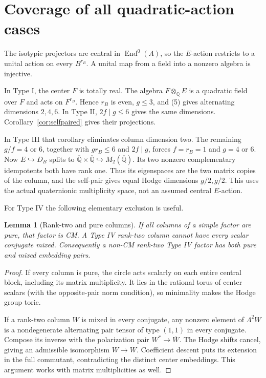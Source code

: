 \documentclass[11pt]{article}
\newcommand{\Q}{\mathbb Q}
\newcommand{\kk}{{\overline{\mathbb Q}}}
\DeclareMathOperator{\End}{End}
\newtheorem{lemma}[theorem]{Lemma}
\theoremstyle{remark}
\begin{document}
\section{Coverage of all quadratic-action cases}

The isotypic projectors are central in $\End^0(A)$, so the $E$-action
restricts to a unital action on every $B^{r_B}$. A unital map from
a field into a nonzero algebra is injective.

In Type I, the center $F$ is totally real. The algebra $F\otimes_\Q E$
is a quadratic field over $F$ and acts on $F^{r_B}$. Hence $r_B$ is
even, $g\leq3$, and (5) gives alternating dimensions $2,4,6$.
In Type II, $2f\mid g\leq6$ gives the same dimensions.
Corollary~\ref{cor:selfpaired} gives their projections.

In Type III that corollary eliminates column dimension two.
The remaining $g/f=4$ or $6$, together with $gr_B\leq6$ and
$2f\mid g$, forces $f=r_B=1$ and $g=4$ or $6$.
Now $E\hookrightarrow D_B$ splits to
$\kk\times\kk\hookrightarrow M_2(\kk)$. Its two nonzero complementary
idempotents both have rank one. Thus its eigenspaces are the two
matrix copies of the column, and the self-pair gives equal Hodge
dimensions $g/2,g/2$. This uses the actual quaternionic
multiplicity space, not an assumed central $E$-action.

For Type IV the following elementary exclusion is useful.
\begin{lemma}[Rank-two and pure columns]\label{lem:pure}
If all columns of a simple factor are pure, that factor is CM.
A Type IV rank-two column cannot have every scalar conjugate mixed.
Consequently a non-CM rank-two Type IV factor has both pure and
mixed embedding pairs.
\end{lemma}
\begin{proof}
If every column is pure, the circle acts scalarly on each entire
central block, including its matrix multiplicity. It lies in the
rational torus of center scalars (with the opposite-pair norm
condition), so minimality makes the Hodge group toric.

If a rank-two column $W$ is mixed in every conjugate, any nonzero
element of $\Lambda^2W$ is a nondegenerate alternating pair tensor
of type $(1,1)$ in every conjugate. Compose its inverse with the
polarization pair $W^*\to\overline W$. The Hodge shifts cancel,
giving an admissible isomorphism $W\to\overline W$.
Coefficient descent puts its extension in the full commutant,
contradicting the distinct center embeddings. This argument works
with matrix multiplicities as well.
\end{proof}
\end{document}
